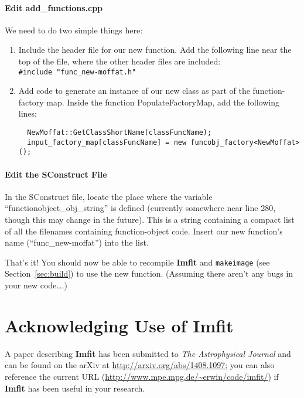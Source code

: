 \documentclass[10pt,a4paper,article]{memoir}
\newcommand{\imfit}{\textbf{Imfit}}
\newcommand{\Imfit}{\textbf{Imfit}}
\newcommand{\makeimage}{\texttt{makeimage}}
\begin{document}
\subsubsection{Edit add\_functions.cpp}

We need to do two simple things here:
\begin{enumerate}
\item Include the header file for our new function. Add the following line near
the top of the file, where the other header files are included:\\
\texttt{\#include "func\_new-moffat.h"}

\item Add code to generate an instance of our new class as part of the
function-factory map. Inside the function PopulateFactoryMap, add the following lines:
\begin{verbatim}
  NewMoffat::GetClassShortName(classFuncName);
  input_factory_map[classFuncName] = new funcobj_factory<NewMoffat>();
\end{verbatim}

\end{enumerate}



\subsubsection{Edit the SConstruct File}

In the SConstruct file, locate the place where the variable
``functionobject\_obj\_string'' is defined (currently somewhere near line 280,
though this may change in the future). This is a string containing a
compact list of all the filenames containing function-object code. Insert our
new function's name (``func\_new-moffat'') into the list.

\bigskip

That's it! You should now be able to recompile \imfit{} and \makeimage{} 
(see Section~\ref{sec:build}) to use
the new function. (Assuming there aren't any bugs in your new code\ldots.)



\chapter{Acknowledging Use of \Imfit}

A paper describing \imfit{} has been submitted to \textit{The Astrophysical Journal}
and can be found on the arXiv at \url{http://arxiv.org/abs/1408.1097}; you can also
reference the current URL (\url{http://www.mpe.mpg.de/~erwin/code/imfit/}) if \imfit{} has
been useful in your research.
\end{document}
